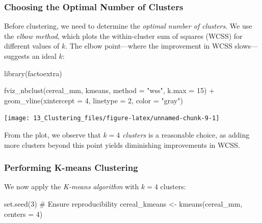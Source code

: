 \documentclass[
  11pt,
]{book}
\makeatletter
\newenvironment{Shaded}{}{}
\newcommand{\AttributeTok}[1]{#1}
\newcommand{\CommentTok}[1]{\textcolor[rgb]{0.36,0.36,0.36}{#1}}
\newcommand{\DecValTok}[1]{#1}
\newcommand{\FunctionTok}[1]{#1}
\newcommand{\NormalTok}[1]{#1}
\newcommand{\OtherTok}[1]{\textcolor[rgb]{0.39,0.39,0.39}{#1}}
\newcommand{\SpecialCharTok}[1]{\textcolor[rgb]{0.39,0.39,0.39}{#1}}
\newcommand{\StringTok}[1]{\textcolor[rgb]{0.39,0.39,0.39}{#1}}
\newenvironment{kframe}{%
\medskip{}
\setlength{\fboxsep}{.8em}
 \def\at@end@of@kframe{}%
 \ifinner\ifhmode%
  \def\at@end@of@kframe{\end{minipage}}%
  \begin{minipage}{\columnwidth}%
 \fi\fi%
 \def\FrameCommand##1{\hskip\@totalleftmargin \hskip-\fboxsep
 \colorbox{shadecolor}{##1}\hskip-\fboxsep
     \hskip-\linewidth \hskip-\@totalleftmargin \hskip\columnwidth}%
 \MakeFramed {\advance\hsize-\width
   \@totalleftmargin\z@ \linewidth\hsize
   \@setminipage}}%
 {\par\unskip\endMakeFramed%
 \at@end@of@kframe}
\renewenvironment{Shaded}{\begin{kframe}}{\end{kframe}}
\theoremstyle{definition}
\theoremstyle{definition}
\theoremstyle{definition}
\theoremstyle{definition}
\theoremstyle{remark}
\makeatother
\begin{document}
\subsubsection*{Choosing the Optimal Number of Clusters}\label{choosing-the-optimal-number-of-clusters}


Before clustering, we need to determine the \emph{optimal number of clusters}. We use the \emph{elbow method}, which plots the within-cluster sum of squares (WCSS) for different values of \(k\). The elbow point---where the improvement in WCSS slows---suggests an ideal \(k\):

\begin{Shaded}
\begin{Highlighting}[]
\FunctionTok{library}\NormalTok{(factoextra)}

\FunctionTok{fviz\_nbclust}\NormalTok{(cereal\_mm, kmeans, }\AttributeTok{method =} \StringTok{"wss"}\NormalTok{, }\AttributeTok{k.max =} \DecValTok{15}\NormalTok{) }\SpecialCharTok{+} 
  \FunctionTok{geom\_vline}\NormalTok{(}\AttributeTok{xintercept =} \DecValTok{4}\NormalTok{, }\AttributeTok{linetype =} \DecValTok{2}\NormalTok{, }\AttributeTok{color =} \StringTok{"gray"}\NormalTok{)}
\end{Highlighting}
\end{Shaded}

\begin{center}\texttt{[image: 13\_Clustering\_files/figure-latex/unnamed-chunk-9-1]} \end{center}

From the plot, we observe that \emph{\(k = 4\) clusters} is a reasonable choice, as adding more clusters beyond this point yields diminishing improvements in WCSS.

\subsubsection*{Performing K-means Clustering}\label{performing-k-means-clustering}


We now apply the \emph{K-means algorithm} with \(k = 4\) clusters:

\begin{Shaded}
\begin{Highlighting}[]
\FunctionTok{set.seed}\NormalTok{(}\DecValTok{3}\NormalTok{)  }\CommentTok{\# Ensure reproducibility}
\NormalTok{cereal\_kmeans }\OtherTok{\textless{}{-}} \FunctionTok{kmeans}\NormalTok{(cereal\_mm, }\AttributeTok{centers =} \DecValTok{4}\NormalTok{)}
\end{Highlighting}
\end{Shaded}
\end{document}
